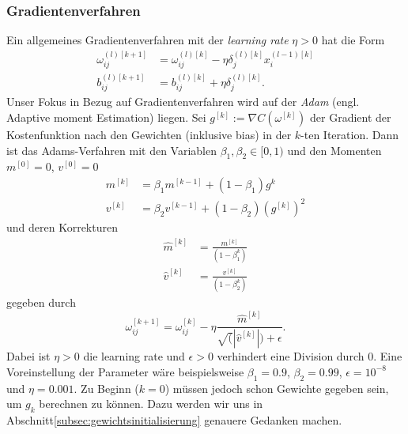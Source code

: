 \subsubsection{Gradientenverfahren}
Ein allgemeines Gradientenverfahren mit der \textit{learning rate} $\eta > 0$ hat die Form
\begin{align*}
    \omega_{ij}^{(l)[k+1]} &= \omega_{ij}^{(l)[k]} - \eta \delta_{j}^{(l)[k]} x_i^{(l-1)[k]}\\
    b_{ij}^{(l)[k+1]} &= b_{ij}^{(l)[k]} + \eta \delta_{j}^{(l)[k]}.
\end{align*}
Unser Fokus in Bezug auf Gradientenverfahren wird auf der \textit{Adam} (engl. Adaptive moment Estimation) liegen. Sei
$g^{[k]} := \nabla C(\omega^{[k]})$ der Gradient der Kostenfunktion nach den Gewichten (inklusive bias) in der $k$-ten
Iteration. Dann ist das Adams-Verfahren mit den Variablen $\beta_1,\beta_2 \in [0,1)$ und den Momenten $m^{[0]}=0$,
$v^{[0]}=0$
\begin{align*}
    m^{[k]} &= \beta_1 m^{[k-1]} + (1-\beta_1)g^{k} \\
    v^{[k]} &= \beta_2 v^{[k-1]} + (1-\beta_2)(g^{[k]})^2
\end{align*}
und deren Korrekturen
\begin{align*}
    \hat{m}^{[k]} &= \frac{m^{[k]}}{(1-\beta_1^k)} \\
    \hat{v}^{[k]} &= \frac{v^{[k]}}{(1-\beta_2^k)}
\end{align*}
gegeben durch
\[
    \omega_{ij}^{[k+1]}= \omega_{ij}^{[k]} - \eta \frac{\hat{m}^{[k]}}{\sqrt(|\hat{v}^{[k]}|) + \epsilon}.
\]
Dabei ist $\eta > 0$ die learning rate und $\epsilon > 0$ verhindert eine Division durch $0$. Eine Voreinstellung der Parameter
wäre beispielsweise $\beta_1=0.9$, $\beta_2=0.99$, $\epsilon=10^{-8}$ und $\eta = 0.001$. Zu Beginn ($k=0$) müssen jedoch schon Gewichte
gegeben sein, um $g_k$ berechnen zu können. Dazu werden wir uns in Abschnitt\eqref{subsec:gewichtsinitialisierung}
genauere Gedanken machen.\\

